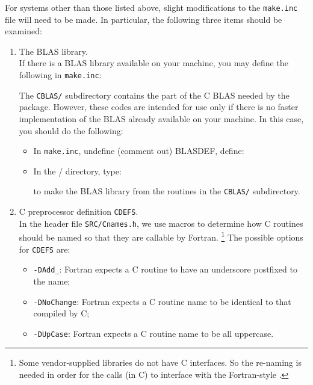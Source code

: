 For systems other than those listed above, slight modifications to the 
{\tt make.inc} file will need to be made. In particular, 
the following three items should be examined:
\begin{enumerate}
\item The BLAS library.\\
   If there is a BLAS library available on your machine, you may define
   the following in {\tt make.inc}:

   \hspace{.4in}{\tt BLASDEF = -DUSE\_VENDOR\_BLAS}

   \vspace{-6pt}
   \hspace{.4in}{\tt BLASLIB = <BLAS library you wish to link with>}

   The {\tt CBLAS/} subdirectory contains the part of the C BLAS needed by 
   the {\superlu} package. However, these codes are intended for use
   only if there is no faster implementation of the BLAS already available
   on your machine. In this case, you should do the following:
   \begin{itemize}
   \item[1)] In {\tt make.inc}, undefine (comment out) BLASDEF, define:

          \hspace{.4in}{\tt BLASLIB = ../blas\$(PLAT).a}

   \item[2)] In the {\superlu/} directory, type:

          \hspace{.4in}{\tt make blaslib}

          to make the BLAS library from the routines in the {\tt CBLAS/}
	  subdirectory.
   \end{itemize}
   
\item C preprocessor definition {\tt CDEFS}.\\
   In the header file {\tt SRC/Cnames.h}, we use macros to determine how
   C routines should be named so that they are callable by Fortran.%
   \footnote{Some vendor-supplied {\BLAS} libraries do not have C 
   interfaces. So the re-naming is needed in order for the {\superlu} {\BLAS}
   calls (in C) to interface with the Fortran-style {\BLAS}.}
   The possible options for {\tt CDEFS} are:
   \begin{itemize}
   \item {\tt -DAdd\_}: Fortran expects a C routine to have an underscore
                        postfixed to the name;
   \item {\tt -DNoChange}: Fortran expects a C routine name to be identical
                        to that compiled by C;
   \item {\tt -DUpCase}: Fortran expects a C routine name to be all uppercase.
   \end{itemize}


\end{enumerate}

